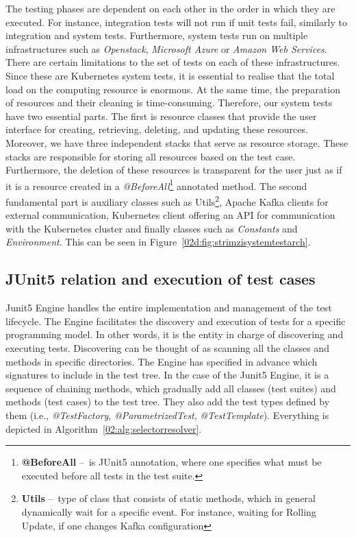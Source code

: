 The testing phases are dependent on each other in the order in which they are executed.
For instance, integration tests will not run if unit tests fail, similarly to integration and system tests.
Furthermore, system tests run on multiple infrastructures such as \emph{Openstack}, \emph{Microsoft Azure} or \emph{Amazon Web Services}.
There are certain limitations to the set of tests on each of these infrastructures.
Since these are Kubernetes system tests, it is essential to realise that the total load on the computing resource is enormous.
At the same time, the preparation of resources and their cleaning is time-consuming.
Therefore, our system tests have two essential parts.
The first is resource classes that provide the user interface for creating, retrieving, deleting, and updating these resources.
Moreover, we have three independent stacks that serve as resource storage.
These stacks are responsible for storing all resources based on the test case.
Furthermore, the deletion of these resources is transparent for the user just as if it is a resource created in a \emph{@BeforeAll}\footnote{\textbf{@BeforeAll } \---\ is JUnit5 annotation, where one specifies what must be executed before all tests in the test suite.} annotated method.
The second fundamental part is auxiliary classes such as Utils\footnote {\textbf{Utils} \---\ type of class that consists of static methods, which in general dynamically wait for a specific event. For instance, waiting for Rolling Update, if one changes Kafka configuration}, Apache Kafka clients for external communication, Kubernetes client offering an API for communication with the Kubernetes cluster and finally classes such as \emph{Constants} and \emph{Environment}. This can be seen in Figure~\ref{02d:fig:strimzisystemtestarch}.

\subsection{JUnit5 relation and execution of test cases}
\label{02:subsec:strimziJunit5relation:execution}

Junit5 Engine handles the entire implementation and management of the test lifecycle.
The Engine facilitates the discovery and execution of tests for a specific programming model.
In other words, it is the entity in charge of discovering and executing tests.
Discovering can be thought of as scanning all the classes and methods in specific directories.
The Engine has specified in advance which signatures to include in the test tree.
In the case of the Junit5 Engine, it is a sequence of chaining methods, which gradually add all classes (test suites) and methods (test cases) to the test tree.
They also add the test types defined by them (i.e., \emph{@TestFactory}, \emph{@ParametrizedTest}, \emph{@TestTemplate}).
Everything is depicted in Algorithm~\ref{02:alg:selectorresolver}.

